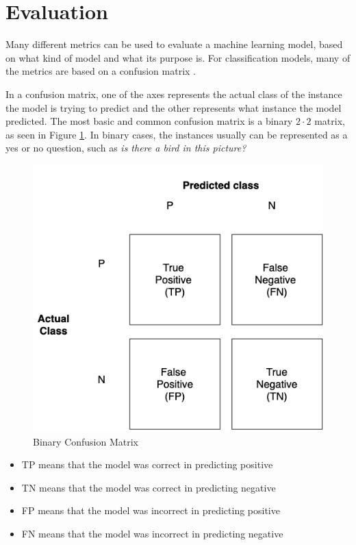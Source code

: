 \documentclass[nofilelist]{cslthse-msc}
\begin{document}
\section{Evaluation}
Many different metrics can be used to evaluate a machine learning model, based on what kind of model and what its purpose is. For classification models, many of the metrics are based on a confusion matrix \citep{FAWCETT2006861}. 

In a confusion matrix, one of the axes represents the actual class of the instance the model is trying to predict and the other represents what instance the model predicted. The most basic and common confusion matrix is a binary $2 \cdot 2$ matrix, as seen in Figure \ref{fig:confusion}. In binary cases, the instances usually can be represented as a yes or no question, such as \textit{is there a bird in this picture?}

\begin{figure}[h!]
    \centering
    \hbox{\hspace{6em}\includegraphics[width=\textwidth/2]{msccls/explanatory_images/confusion_matrix.png}}
    \caption{Binary Confusion Matrix}
    \label{fig:confusion}
\end{figure}

\begin{itemize}
    \item TP means that the model was correct in predicting positive
    \item TN means that the model was correct in predicting negative
    \item FP means that the model was incorrect in predicting positive
    \item FN means that the model was incorrect in predicting negative
\end{itemize}
\end{document}
